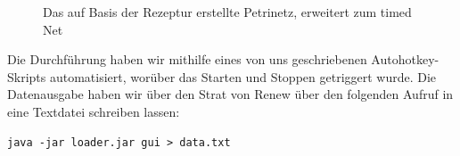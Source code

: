 \begin{figure}[ht]
  \caption{Das auf Basis der Rezeptur erstellte Petrinetz, erweitert zum timed Net}
  \label{pic:petrinetz}
\end{figure}

Die Durchführung haben wir mithilfe eines von uns geschriebenen Autohotkey-Skripts automatisiert, worüber das Starten und Stoppen getriggert wurde. Die Datenausgabe haben wir über den Strat von Renew über den folgenden Aufruf in eine Textdatei schreiben lassen:
\begin{lstlisting}
java -jar loader.jar gui > data.txt
\end{lstlisting}

